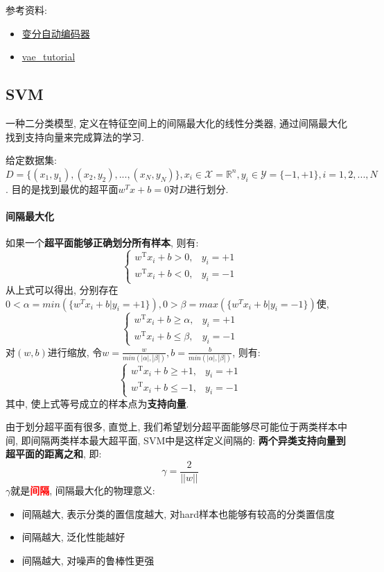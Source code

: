 参考资料: 
\begin{itemize}
	\item \href{https://www.cnblogs.com/kexinxin/p/9858525.html}{变分自动编码器}
	\item \href{https://github.com/cdoersch/vae_tutorial}{vae\_tutorial}
\end{itemize}

\subsection{SVM}
一种二分类模型, 定义在特征空间上的间隔最大化的线性分类器, 通过间隔最大化找到支持向量来完成算法的学习. 

给定数据集: $D = \{(x_1, y_1), (x_2, y_2), ..., (x_N, y_N)\}, x_i \in \mathcal{X} = \mathbb{R}^n, y_i \in \mathcal{Y} = \{-1, +1\}, i = 1, 2, ..., N$. 目的是找到最优的超平面$w^T x + b = 0$对$D$进行划分. 

\paragraph{间隔最大化}如果一个\textbf{超平面能够正确划分所有样本}, 则有: 
$$
\begin{cases}
	{w}^{\mathrm{T}} {x}_{i}+b > 0, & y_{i}=+1 \\ 
	{w}^{\mathrm{T}} {x}_{i}+b < 0, & y_{i}=-1
\end{cases}
$$ 
从上式可以得出, 分别存在$0 < \alpha = min(\{w^T x_i + b | y_i = +1\}), 0 > \beta = max(\{w^T x_i + b | y_i = -1\})$使, 
$$
\begin{cases}
	{w}^{\mathrm{T}} {x}_{i}+b \geqslant \alpha, & y_{i}=+1 \\ 
	{w}^{\mathrm{T}} {x}_{i}+b \leqslant \beta, & y_{i}=-1
\end{cases}
$$
对$(w, b)$进行缩放, 令$w = \frac{w}{min(|\alpha|, |\beta|)}, b = \frac{b}{min(|\alpha|, |\beta|)} $, 则有: 
$$
\begin{cases}
	{w}^{\mathrm{T}} {x}_{i}+b \geqslant +1, & y_{i}=+1 \\ 
	{w}^{\mathrm{T}} {x}_{i}+b \leqslant -1, & y_{i}=-1
\end{cases}
$$
其中, 使上式等号成立的样本点为\textbf{支持向量}. 

由于划分超平面有很多, 直觉上, 我们希望划分超平面能够尽可能位于两类样本中间, 即间隔两类样本最大超平面, SVM中是这样定义间隔的: \textbf{两个异类支持向量到超平面的距离之和}, 即: 
$$
\gamma = \frac{2}{||w||}
$$
$\gamma$就是\textbf{\textcolor{red}{间隔}}, 间隔最大化的物理意义: 
\begin{itemize}
	\item 间隔越大, 表示分类的置信度越大, 对hard样本也能够有较高的分类置信度
	\item 间隔越大, 泛化性能越好
	\item 间隔越大, 对噪声的鲁棒性更强
\end{itemize}


